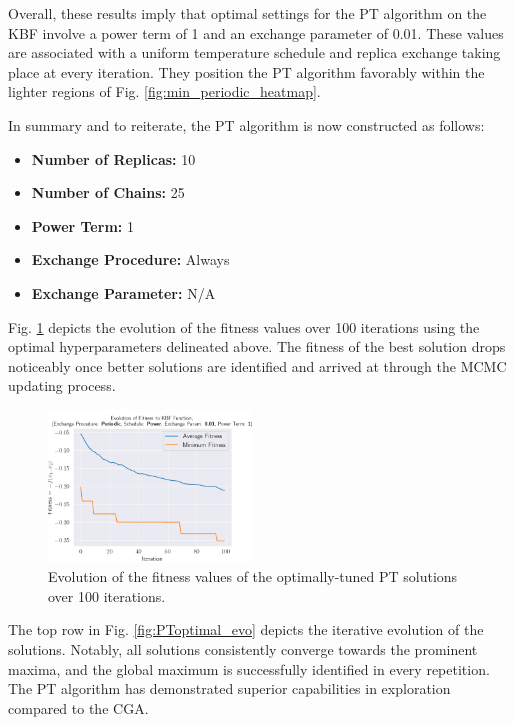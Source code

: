\documentclass[10pt]{article}
\begin{document}
\begin{multicols}{2}
Overall, these results imply that optimal settings for the PT algorithm on the KBF involve a power term of 1 and an exchange parameter of 0.01. These values are associated with a uniform temperature schedule and replica exchange taking place at every iteration. They position the PT algorithm favorably within the lighter regions of Fig. \ref{fig:min_periodic_heatmap}.

\columnbreak

In summary and to reiterate, the PT algorithm is now constructed as follows:

\begin{itemize}
    \item \textbf{Number of Replicas:} 10
    \item \textbf{Number of Chains:} 25
    \item \textbf{Power Term:} 1
    \item \textbf{Exchange Procedure:} Always
    \item \textbf{Exchange Parameter:} N/A
\end{itemize}

Fig. \ref{fig:PToptimal_fitness} depicts the evolution of the fitness values over 100 iterations using the optimal hyperparameters delineated above. The fitness of the best solution drops noticeably once better solutions are identified and arrived at through the MCMC updating process.

\begin{figure}[H]
    \centering
    \includegraphics[width=0.48\textwidth]{../figures/Permanent Images/0.01_1_Periodic_Fitness.png}
    \captionsetup{justification=centering}
    \caption{Evolution of the fitness values of the optimally-tuned PT solutions over 100 iterations.}
    \label{fig:PToptimal_fitness}
\end{figure}

The top row in Fig. \ref{fig:PToptimal_evo} depicts the iterative evolution of the solutions. Notably, all solutions consistently converge towards the prominent maxima, and the global maximum is successfully identified in every repetition. The PT algorithm has demonstrated superior capabilities in exploration compared to the CGA.


\end{multicols}
\end{document}
